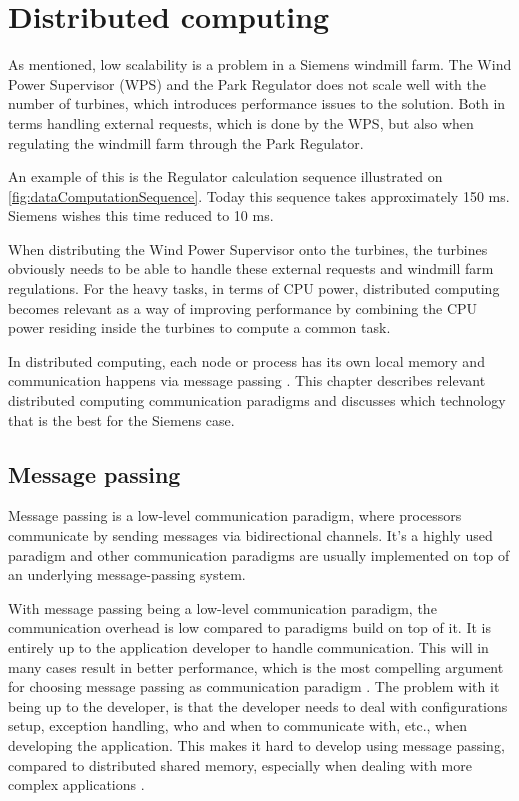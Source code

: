 \chapter{Distributed computing}
As mentioned, low scalability is a problem in a Siemens windmill farm. The Wind Power Supervisor (WPS) and the Park Regulator does not scale well with the number of turbines, which introduces performance issues to the solution. Both in terms handling external requests, which is done by the WPS, but also when regulating the windmill farm through the Park Regulator. 

An example of this is the Regulator calculation sequence illustrated on \cref{fig:dataComputationSequence}. Today this sequence takes approximately 150 ms. Siemens wishes this time reduced to 10 ms.

When distributing the Wind Power Supervisor onto the turbines, the turbines obviously needs to be able to handle these external requests and windmill farm regulations. For the heavy tasks, in terms of CPU power, distributed computing becomes relevant as a way of improving performance by combining the CPU power residing inside the turbines to compute a common task. 

In distributed computing, each node or process has its own local memory and communication happens via message passing \cite{andrews2000foundations}. This chapter describes relevant distributed computing communication paradigms and discusses which technology that is the best for the Siemens case. 


\section{Message passing}

Message passing is a low-level communication paradigm, where processors communicate by sending messages via bidirectional channels. It's a highly used paradigm and other communication paradigms are usually implemented on top of an underlying message-passing system.  

With message passing being a low-level communication paradigm, the communication overhead is low compared to paradigms build on top of it. It is entirely up to the application developer to handle communication. This will in many cases result in better performance, which is the most compelling argument for choosing message passing as communication paradigm \cite{lu1995message}. The problem with it being up to the developer, is that the developer needs to deal with configurations setup, exception handling, who and when to communicate with, etc., when developing the application. This makes it hard to develop using message passing, compared to distributed shared memory, especially when dealing with more complex applications \cite{lu1995message}. 

